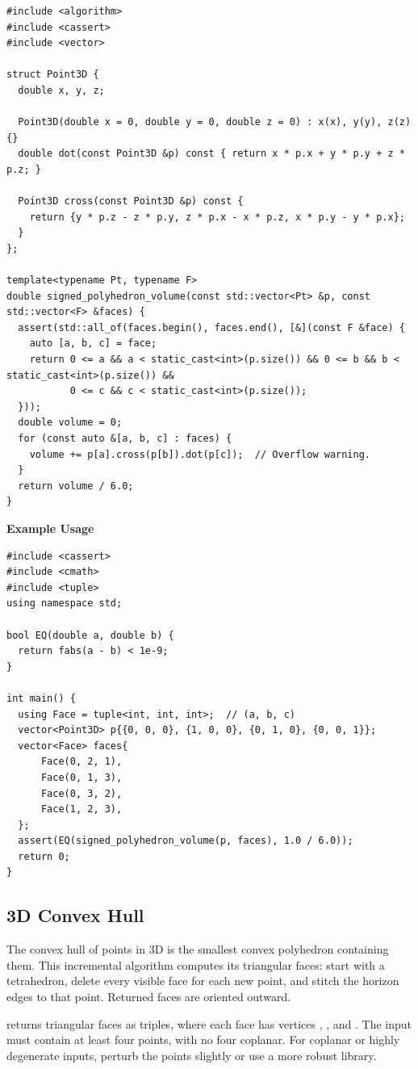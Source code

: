 \begin{lstlisting}[style=cpp]
#include <algorithm>
#include <cassert>
#include <vector>

struct Point3D {
  double x, y, z;

  Point3D(double x = 0, double y = 0, double z = 0) : x(x), y(y), z(z) {}
  double dot(const Point3D &p) const { return x * p.x + y * p.y + z * p.z; }

  Point3D cross(const Point3D &p) const {
    return {y * p.z - z * p.y, z * p.x - x * p.z, x * p.y - y * p.x};
  }
};

template<typename Pt, typename F>
double signed_polyhedron_volume(const std::vector<Pt> &p, const std::vector<F> &faces) {
  assert(std::all_of(faces.begin(), faces.end(), [&](const F &face) {
    auto [a, b, c] = face;
    return 0 <= a && a < static_cast<int>(p.size()) && 0 <= b && b < static_cast<int>(p.size()) &&
           0 <= c && c < static_cast<int>(p.size());
  }));
  double volume = 0;
  for (const auto &[a, b, c] : faces) {
    volume += p[a].cross(p[b]).dot(p[c]);  // Overflow warning.
  }
  return volume / 6.0;
}
\end{lstlisting}
\textbf{Example Usage}\par
\begin{lstlisting}[style=cpp]
#include <cassert>
#include <cmath>
#include <tuple>
using namespace std;

bool EQ(double a, double b) {
  return fabs(a - b) < 1e-9;
}

int main() {
  using Face = tuple<int, int, int>;  // (a, b, c)
  vector<Point3D> p{{0, 0, 0}, {1, 0, 0}, {0, 1, 0}, {0, 0, 1}};
  vector<Face> faces{
      Face(0, 2, 1),
      Face(0, 1, 3),
      Face(0, 3, 2),
      Face(1, 2, 3),
  };
  assert(EQ(signed_polyhedron_volume(p, faces), 1.0 / 6.0));
  return 0;
}
\end{lstlisting}
\subsection{3D Convex Hull}
\label{sec:7.5.3}
The convex hull of points in 3D is the smallest convex polyhedron containing them. This incremental algorithm computes its triangular faces: start with a tetrahedron, delete every visible face for each new point, and stitch the horizon edges to that point. Returned faces are oriented outward.

\begin{compactitem}
  \item {} returns triangular faces as  triples, where each face has vertices , , and . The input must contain at least four points, with no four coplanar. For coplanar or highly degenerate inputs, perturb the points slightly or use a more robust library.
\end{compactitem}

